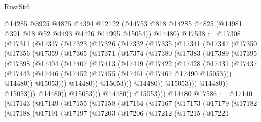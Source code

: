 \begin{lexlean}{RustStd}
\begin{coremodule}
      @14285
      @3925
      @4825
      @4394
      @12122
      (@14753 @818 @14285 @4825 (@14981 @391 @18 @52 @4493 @4426 @14995 @15054))
      @14480)
@17538 := @17308
    (@17311
      (@17317
        (@17323
          (@17326
            (@17332
              (@17335
                (@17341
                  (@17347
                    (@17350
                      (@17356
                        (@17359
                          (@17365
                            (@17371
                              (@17374
                                (@17380
                                  (@17383
                                    (@17389
                                      (@17395
                                        (@17398
                                          (@17404
                                            (@17407
                                              (@17413
                                                (@17419
                                                  (@17422
                                                    (@17428
                                                      (@17431
                                                        (@17437
                                                          (@17443
                                                            (@17446
                                                              (@17452
                                                                (@17455
                                                                  (@17461 (@17467 @17490 @15053)))
                                                                @14480))
                                                            @15053)))
                                                      @14480))
                                                  @15053)))
                                            @14480))
                                        @15053)))
                                  @14480))
                              @15053)))
                        @14480))
                    @15053)))
              @14480))
          @15053)))
    @14480
@17586 := @17140
    (@17143
      (@17149
        (@17155
          (@17158
            (@17164
              (@17167
                (@17173
                  (@17179
                    (@17182
                      (@17188
                        (@17191
                          (@17197
                            (@17203
                              (@17206
                                (@17212
                                  (@17215
                                    (@17221

\end{coremodule}
\end{lexlean}
